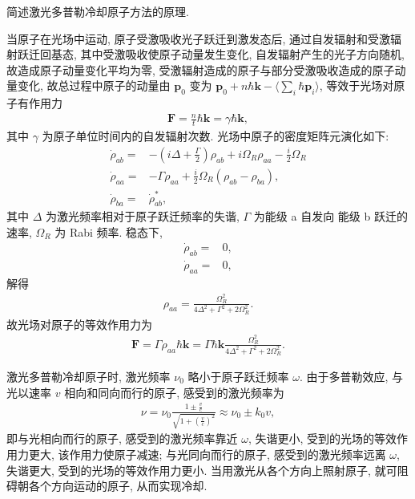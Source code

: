 \documentclass{assignment}
\begin{document}
\begin{prob}
    简述激光多普勒冷却原子方法的原理.
\end{prob}
\begin{sol}
    当原子在光场中运动, 原子受激吸收光子跃迁到激发态后, 通过自发辐射和受激辐射跃迁回基态, 其中受激吸收使原子动量发生变化, 自发辐射产生的光子方向随机, 故造成原子动量变化平均为零, 受激辐射造成的原子与部分受激吸收造成的原子动量变化, 故总过程中原子的动量由 $\bm{p}_0$ 变为 $\bm{p}_0+n\hbar\bm{k}-\langle\sum_i\hbar\bm{p}_i\rangle$, 等效于光场对原子有作用力
    \begin{align}
        \bm{F}=\frac{n}{t}\hbar\bm{k}=\gamma\hbar\bm{k},
    \end{align}
    其中 $\gamma$ 为原子单位时间内的自发辐射次数.
    光场中原子的密度矩阵元演化如下:
    \begin{align}
        \dot{\rho}_{ab}=&-\left(i\Delta+\frac{\Gamma}{2}\right)\rho_{ab}+i\Omega_R\rho_{aa}-\frac{i}{2}\Omega_R\\
        \dot{\rho}_{aa}=&-\Gamma\rho_{aa}+\frac{i}{2}\Omega_R(\rho_{ab}-\rho_{ba}),\\
        \dot{\rho}_{ba}=&\dot{\rho}_{ab}^*,
    \end{align}
    其中 $\Delta$ 为激光频率相对于原子跃迁频率的失谐, $\Gamma$ 为能级 a 自发向 能级 b 跃迁的速率, $\Omega_R$ 为 Rabi 频率.
    稳态下,
    \begin{align}
        \dot{\rho}_{ab}=&0,\\
        \dot{\rho}_{aa}=&0,
    \end{align}
    解得
    \begin{align}
        \rho_{aa}=\frac{\Omega_R^2}{4\Delta^2+\Gamma^2+2\Omega_R^2}.
    \end{align}
    故光场对原子的等效作用力为
    \begin{align}
        \bm{F}=\Gamma\rho_{aa}\hbar\bm{k}=\Gamma\hbar\bm{k}\frac{\Omega_R^2}{4\Delta^2+\Gamma^2+2\Omega_R^2}.
    \end{align}

    激光多普勒冷却原子时, 激光频率 $\nu_0$ 略小于原子跃迁频率 $\omega$. 由于多普勒效应, 与光以速率 $v$ 相向和同向而行的原子, 感受到的激光频率为
    \begin{align}
        \nu=\nu_0\frac{1\pm\frac{v}{c}}{\sqrt{1+\left(\frac{v}{c}\right)^2}}\approx\nu_0\pm k_0v,
    \end{align}
    即与光相向而行的原子, 感受到的激光频率靠近 $\omega$, 失谐更小, 受到的光场的等效作用力更大, 该作用力使原子减速; 与光同向而行的原子, 感受到的激光频率远离 $\omega$, 失谐更大, 受到的光场的等效作用力更小.
    当用激光从各个方向上照射原子, 就可阻碍朝各个方向运动的原子, 从而实现冷却.
\end{sol}
\end{document}
